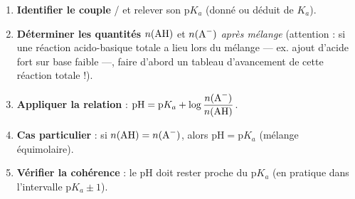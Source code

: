 \documentclass[11pt]{article}
\begin{document}
\begin{methode}
\begin{enumerate}
\item \textbf{Identifier le couple} / et relever son $\text{p}K_a$ (donné ou déduit de $K_a$).
\item \textbf{Déterminer les quantités} $n(\ce{AH})$ et $n(\ce{A-})$ \emph{après mélange} (attention : si une réaction acido-basique totale a lieu lors du mélange — ex. ajout d'acide fort sur base faible —, faire d'abord un tableau d'avancement de cette réaction totale !).
\item \textbf{Appliquer la relation} : $\text{pH} = \text{p}K_a + \log\dfrac{n(\ce{A-})}{n(\ce{AH})}$.
\item \textbf{Cas particulier} : si $n(\ce{AH}) = n(\ce{A-})$, alors $\text{pH} = \text{p}K_a$ (mélange équimolaire).
\item \textbf{Vérifier la cohérence} : le pH doit rester proche du $\text{p}K_a$ (en pratique dans l'intervalle $\text{p}K_a \pm 1$).
\end{enumerate}
\end{methode}
\end{document}
